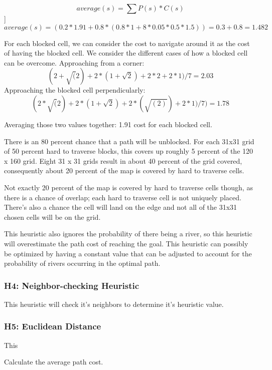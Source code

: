 \[average(s) = \sum{P(s)*C(s)}  \]]
\[average(s) = (0.2 * 1.91 + 0.8 * ( 0.8 * 1 + 8*0.05*0.5*1.5 ) ) = 0.3 + 0.8 = 1.482\]

For each blocked cell, we can consider the cost to navigate around it as the cost of having the blocked cell. We consider the different cases of how a blocked cell can be overcome. 
Approaching from a corner: \[(2 + \sqrt(2) + 2 * ( 1 + \sqrt{2}) + 2 * 2 + 2 * 1) / 7  = 2.03\]
Approaching the blocked cell perpendicularly: \[ (2*\sqrt(2) + 2*(1 + \sqrt{2}) + 2 * (\sqrt{(2)}) + 2*1 )/ 7 ) = 1.78 \]

Averaging those two values together: 1.91 cost for each blocked cell.

There is an 80 percent chance that a path will be unblocked.
For each 31x31 grid of 50 percent hard to traverse blocks, this covers up roughly 5 percent of the 120 x 160 grid. Eight 31 x 31 grids result in about 40 percent of the grid covered, consequently about 20 percent of the map is covered by hard to traverse cells.

Not exactly 20 percent of the map is covered by hard to traverse cells though, as there is a chance of overlap; each hard to traverse cell is not uniquely placed. There's also a chance the cell will land on the edge and not all of the 31x31 chosen cells will be on the grid.

This heuristic also ignores the probability of there being a river, so this heuristic will overestimate the path cost of reaching the goal. This heuristic can possibly be optimized by having a constant value that can be adjusted to account for the probability of rivers occurring in the optimal path.

\subsubsection{H4: Neighbor-checking Heuristic}
This heuristic will check it's neighbors to determine it's heuristic value.

\subsubsection{H5: Euclidean Distance}
This


Calculate the average path cost.